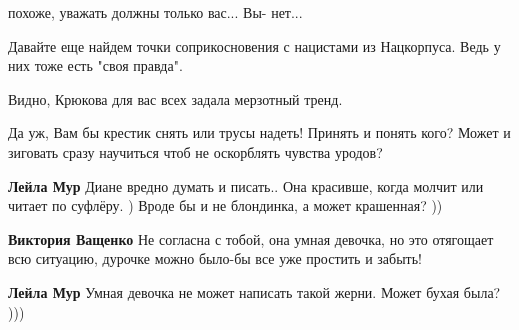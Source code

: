 \begin{itemize}
похоже, уважать должны только вас... Вы- нет...


Давайте еще найдем точки соприкосновения с нацистами из Нацкорпуса. Ведь у них
тоже есть "своя правда".

Видно, Крюкова для вас всех задала мерзотный тренд.

 

Да уж, Вам бы крестик снять или трусы надеть! Принять и понять кого? Может и
зиговать сразу научиться чтоб не оскорблять чувства уродов?

\begin{itemize}
 
\textbf{Лейла Мур} Диане вредно думать и писать.. Она красивше, когда молчит или читает по суфлёру. ) Вроде бы и не блондинка, а может крашенная? ))

 
\textbf{Виктория Ващенко} Не согласна с тобой, она умная девочка, но это отягощает всю ситуацию, дурочке можно было-бы все уже простить и забыть!

 
\textbf{Лейла Мур} Умная девочка не может написать такой жерни. Может бухая была? )))

 

\end{itemize}
\end{itemize}
